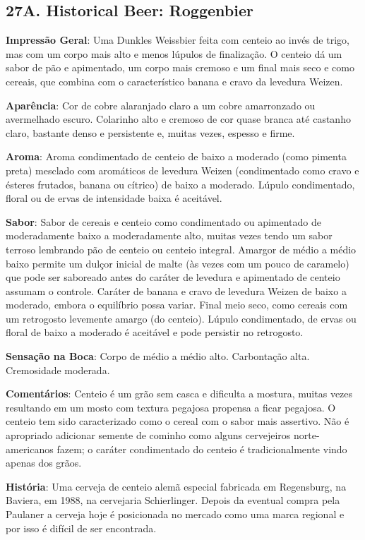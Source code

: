 \subsection*{27A. Historical Beer: Roggenbier}
\textbf{Impressão Geral}: Uma Dunkles Weissbier feita com centeio ao invés de trigo, mas com um corpo mais alto e menos lúpulos de finalização. O centeio dá um sabor de pão e apimentado, um corpo mais cremoso e um final mais seco e como cereais, que combina com o característico banana e cravo da levedura Weizen.

\textbf{Aparência}: Cor de cobre alaranjado claro a um cobre amarronzado ou avermelhado escuro. Colarinho alto e cremoso de cor quase branca até castanho claro, bastante denso e persistente e, muitas vezes, espesso e firme.

\textbf{Aroma}: Aroma condimentado de centeio de baixo a moderado (como pimenta preta) mesclado com aromáticos de levedura Weizen (condimentado como cravo e ésteres frutados, banana ou cítrico) de baixo a moderado. Lúpulo condimentado, floral ou de ervas de intensidade baixa é aceitável.

\textbf{Sabor}: Sabor de cereais e centeio como condimentado ou apimentado de moderadamente baixo a moderadamente alto, muitas vezes tendo um sabor terroso lembrando pão de centeio ou centeio integral. Amargor de médio a médio baixo permite um dulçor inicial de malte (às vezes com um pouco de caramelo) que pode ser saboreado antes do caráter de levedura e apimentado de centeio assumam o controle. Caráter de banana e cravo de levedura Weizen de baixo a moderado, embora o equilíbrio possa variar. Final meio seco, como cereais com um retrogosto levemente amargo (do centeio). Lúpulo condimentado, de ervas ou floral de baixo a moderado é aceitável e pode persistir no retrogosto.

\textbf{Sensação na Boca}: Corpo de médio a médio alto. Carbontação alta. Cremosidade moderada.

\textbf{Comentários}: Centeio é um grão sem casca e dificulta a mostura, muitas vezes resultando em um mosto com textura pegajosa propensa a ficar pegajosa. O centeio tem sido caracterizado como o cereal com o sabor mais assertivo. Não é apropriado adicionar semente de cominho como alguns cervejeiros norte-americanos fazem; o caráter condimentado do centeio é tradicionalmente vindo apenas dos grãos.

\textbf{História}: Uma cerveja de centeio alemã especial fabricada em Regensburg, na Baviera, em 1988, na cervejaria Schierlinger. Depois da eventual compra pela Paulaner a cerveja hoje é posicionada no mercado como uma marca regional e por isso é difícil de ser encontrada.


